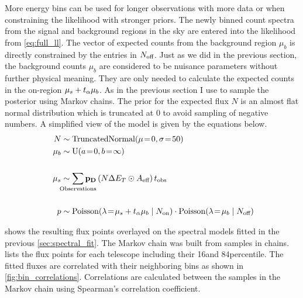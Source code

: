 More energy bins can be used for longer observations with more data or when constraining the likelihood with stronger priors. 
The newly binned count spectra from the signal and background regions in the sky 
are entered into the likelihood from \cref{eq:full_ll}. The vector of expected counts from the background region $\mu_b$ is directly constrained 
by the entries in $N_\text{off}$. Just as we did in the previous section, the background counts $\mu_b$ are considered to be nuisance parameters 
without further physical meaning. They are only needed to calculate the expected counts in the on-region $\mu_s + t_{\alpha} \mu_b$. 
As in the previous section I use \pymc to sample the posterior using Markov chains. The prior for the expected flux $N$ is 
an almost flat normal distribution which is truncated at 0 to avoid sampling of negative numbers. A simplified view of the model is given by the  
equations below.
\begin{align*}
  N &\sim \operatorname{TruncatedNormal}(\mu\! =\!0, \sigma\! = \! 50) \\
  \mu_b &\sim \operatorname{U}(a\! =\!0, b\! = \!\infty) \\\
  \quad \\
  \mu_s &\sim  \sum_{\mathclap{\text{Observations}}} \edisp \, (N \Delta \etrue \odot \aeff) \, \tobs \\
  \quad \\
  p &\sim \operatorname{Poisson}(\lambda\! =\!\mu_s + \talpha \mu_b \mid \Non) \cdot \operatorname{Poisson}(\lambda\! =\! \mu_b \mid \Noff)
\end{align*}

 shows the resulting flux points overlayed on the spectral models fitted in the previous \cref{sec:spectral_fit}.
The Markov chain was built from  samples in  chains. 
 lists the flux points for each telescope including their 16\th and 84\th percentile. 
The fitted fluxes are correlated with their neighboring bins as shown in \cref{fig:bin_correlations}. Correlations are calculated between 
the samples in the Markov chain using Spearman's correlation coefficient. 



